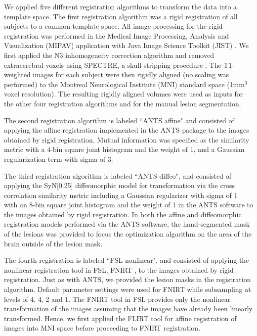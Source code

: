\documentclass[10pt]{article}
\begin{document}
We applied five different registration algorithms to transform the data into a template space. The first registration algorithm was a rigid registration of all subjects to a common template space.  All image processing for the rigid registration was performed in the Medical Image Processing, Analysis and Visualization (MIPAV) application \cite{mcauliffe2001medical} with Java Image Science Toolkit (JIST)  \cite{lucas2010java}.   We first applied the N3 inhomogeneity correction algorithm \cite{sled1998nonparametric} and removed extracerebral voxels using SPECTRE, a skull-stripping procedure \cite{carass2011simple}.   The T1-weighted images for each subject were then rigidly aligned (no scaling was performed) to the Montreal Neurological Institute (MNI) standard space (1mm$^3$ voxel resolution). The resulting rigidly aligned volumes were used as inputs for the other four registration algorithms and for the manual lesion segmentation. 

The second registration algorithm is labeled ``ANTS affine" and consisted of applying the affine registration implemented in the ANTS package \cite{avants2011advanced} to the images obtained by rigid registration. Mutual information was specified as the similarity metric with a 4-bin square joint histogram and the weight of 1, and a Gaussian regularization term with sigma of 3. 

The third registration algorithm is labeled ``ANTS diffeo", and consisted of applying the SyN[0.25] diffeomorphic model for transformation via the cross correlation similarity metric including a Gaussian regularizer with sigma of 1 with an 8-bin square joint histogram and the weight of 1 in the ANTS software \cite{avants2011advanced} to the images obtained by rigid registration. In both the affine and diffeomorphic registration models performed via the ANTS software, the hand-segmented mask of the lesions was provided to focus the optimization algorithm on the area of the brain outside of the lesion mask. 

The fourth registration is labeled ``FSL nonlinear", and consisted of applying the nonlinear
registration tool in FSL, FNIRT \cite{jenkinson2012fsl}, to the images obtained by rigid registration. Just as with ANTS, we provided the lesion masks in the registration algorithm. Default parameter settings were used for FNIRT while subsampling at levels of 4, 4, 2 and 1. The FNIRT tool in FSL provides only the nonlinear transformation of the images assuming that the images have already been linearly transformed. Hence, we first applied the FLIRT tool for affine registration of images into MNI space before proceeding to FNIRT registration. 
\end{document}
